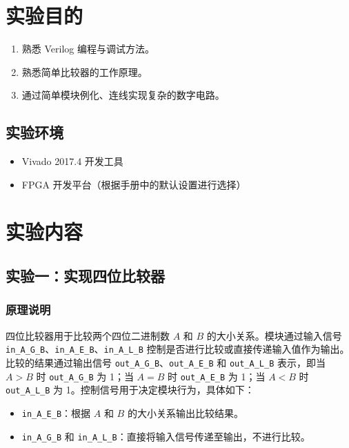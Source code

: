 \documentclass[zihao=5, UTF8]{article}
\theoremstyle{MyLineTheoremStyle} %
\theoremstyle{MyBlockTheoremStyle} %
\theoremstyle{MySubsubsectionStyle} %
\begin{document}
\section{实验目的}\thispagestyle{fancy}
\begin{enumerate}
    \item 熟悉 Verilog 编程与调试方法。
    \item 熟悉简单比较器的工作原理。
    \item 通过简单模块例化、连线实现复杂的数字电路。
\end{enumerate}

\subsection{实验环境}
\begin{itemize}
    \item Vivado 2017.4 开发工具
    \item FPGA 开发平台（根据手册中的默认设置进行选择）
\end{itemize}


\section{实验内容}

\subsection{实验一：实现四位比较器}
\subsubsection{原理说明}
四位比较器用于比较两个四位二进制数 $A$ 和 $B$ 的大小关系。模块通过输入信号 \texttt{in\_A\_G\_B}、\texttt{in\_A\_E\_B}、\texttt{in\_A\_L\_B} 控制是否进行比较或直接传递输入值作为输出。比较的结果通过输出信号 \texttt{out\_A\_G\_B}、\texttt{out\_A\_E\_B} 和 \texttt{out\_A\_L\_B} 表示，即当 $A > B$ 时 \texttt{out\_A\_G\_B} 为 1；当 $A = B$ 时 \texttt{out\_A\_E\_B} 为 1；当 $A < B$ 时 \texttt{out\_A\_L\_B} 为 1。控制信号用于决定模块行为，具体如下：
\begin{itemize}
    \item \texttt{in\_A\_E\_B}：根据 $A$ 和 $B$ 的大小关系输出比较结果。
    \item \texttt{in\_A\_G\_B} 和 \texttt{in\_A\_L\_B}：直接将输入信号传递至输出，不进行比较。
\end{itemize}
\end{document}
